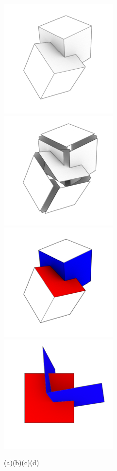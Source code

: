 \begin{figure}[h]
    \begin{center}
        \includegraphics[width=.25\textwidth]{./img/ch1-1.pdf}%
        \includegraphics[width=.25\textwidth]{./img/ch1-2.pdf}%
        \includegraphics[width=.25\textwidth]{./img/ch1-3.pdf}%
        \includegraphics[width=.25\textwidth]{./img/ch1-4.pdf}%

        (a)\hspace{.22\textwidth}(b)\hspace{.22\textwidth}(c)\hspace{.22\textwidth}(d)
    \end{center}
    

\end{figure}

